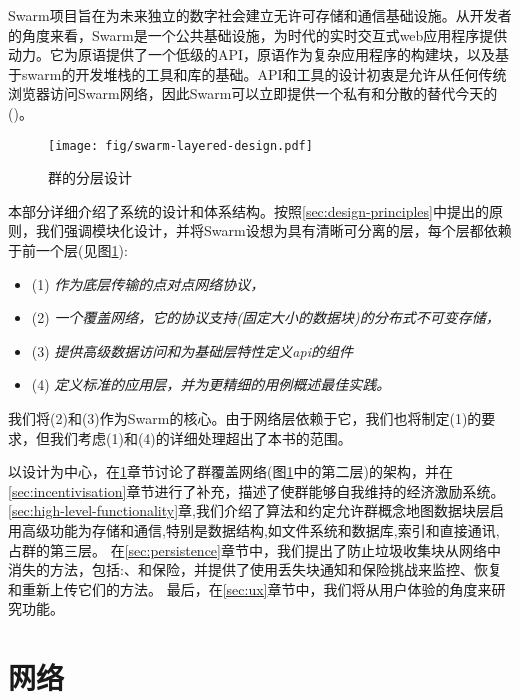 
\green{}

Swarm项目旨在为未来独立的数字社会建立无许可存储和通信基础设施。从开发者的角度来看，Swarm是一个公共基础设施，为时代的实时交互式web应用程序提供动力。它为原语提供了一个低级的API，原语作为复杂应用程序的构建块，以及基于swarm的开发堆栈的工具和库的基础。API和工具的设计初衷是允许从任何传统浏览器访问Swarm网络，因此Swarm可以立即提供一个私有和分散的替代今天的 ()。

\begin{figure}[htbp]
  \centering
    \texttt{[image: fig/swarm-layered-design.pdf]}
  \caption[Swarm的分层设计\statusgreen]{群的分层设计}
\label{fig:Swarm-layered-design}
\end{figure}

本部分详细介绍了系统的设计和体系结构。按照\ref{sec:design-principles}中提出的原则，我们强调模块化设计，并将Swarm设想为具有清晰可分离的层，每个层都依赖于前一个层(见图\ref{fig:Swarm-layered-design}):

\begin{itemize}
\item (1) \emph{作为底层传输的点对点网络协议，}
\item (2) \emph{一个覆盖网络，它的协议支持(固定大小的数据块)的分布式不可变存储，}
\item (3) \emph{提供高级数据访问和为基础层特性定义api的组件}
\item (4) \emph{定义标准的应用层，并为更精细的用例概述最佳实践。}
\end{itemize}

我们将(2)和(3)作为Swarm的核心。由于网络层依赖于它，我们也将制定(1)的要求，但我们考虑(1)和(4)的详细处理超出了本书的范围。


以设计为中心，在\ref{sec:network}章节讨论了群覆盖网络(图\ref{fig:Swarm-layered-design}中的第二层)的架构，并在\ref{sec:incentivisation}章节进行了补充，描述了使群能够自我维持的经济激励系统。\ref{sec:high-level-functionality}章,我们介绍了算法和约定允许群概念地图数据块层启用高级功能为存储和通信,特别是数据结构,如文件系统和数据库,索引和直接通讯,占群的第三层。
在\ref{sec:persistence}章节中，我们提出了防止垃圾收集块从网络中消失的方法，包括:、和保险，并提供了使用丢失块通知和保险挑战来监控、恢复和重新上传它们的方法。
最后，在\ref{sec:ux}章节中，我们将从用户体验的角度来研究功能。

\chapter{网络}\label{sec:network}

